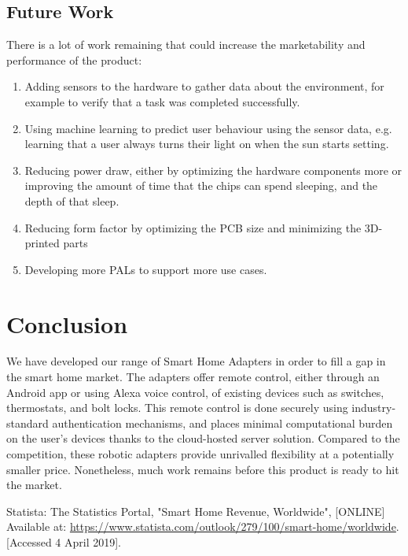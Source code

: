 \documentclass[onecolumn]{IEEEtran}
\begin{document}
{    \subsection{Future Work}
    There is a lot of work remaining that could increase the marketability and performance of the product:
    \begin{enumerate}
        \item Adding sensors to the hardware to gather data about the environment, for example to verify that a task was completed successfully.
        \item Using machine learning to predict user behaviour using the sensor data, e.g. learning that a user always turns their light on when the sun starts setting.
        \item Reducing power draw, either by optimizing the hardware components more or improving the amount of time that the chips can spend sleeping, and the depth of that sleep.
        \item Reducing form factor by optimizing the PCB size and minimizing the 3D-printed parts
        \item Developing more PALs to support more use cases.
    \end{enumerate}

\section{Conclusion}

We have developed our range of Smart Home Adapters in order to fill a gap in the smart home market. The adapters offer remote control, either through an Android app or using Alexa voice control, of existing devices such as switches, thermostats, and bolt locks. This remote control is done securely using industry-standard authentication mechanisms, and places minimal computational burden on the user's devices thanks to the cloud-hosted server solution. Compared to the competition, these robotic adapters provide unrivalled flexibility at a potentially smaller price. Nonetheless, much work remains before this product is ready to hit the market. 

\begin{thebibliography}{10}

 Statista: The Statistics Portal,
 "Smart Home Revenue, Worldwide",
  [ONLINE] Available at: \url{https://www.statista.com/outlook/279/100/smart-home/worldwide}. [Accessed 4 April 2019].
  

\end{thebibliography}}
\end{document}
